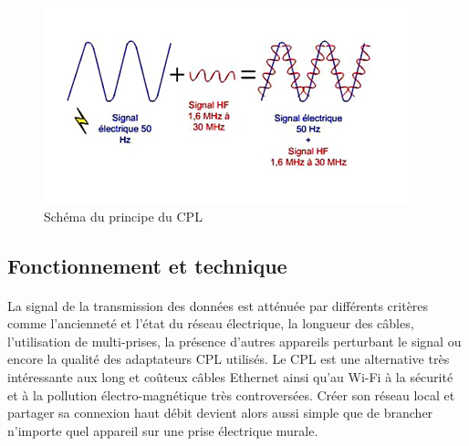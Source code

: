     \begin{figure}[h]
        \begin{center}
            \includegraphics[scale=0.7]{./images/cpl/principeCpl.jpg}
        \end{center}
            \caption{ Schéma du principe du CPL } %
            \label{Principe du CPL}
    \end{figure}

        \subsection{Fonctionnement et technique}
            \paragraph{}
La signal de la transmission des données est atténuée par différents critères comme l’ancienneté et l'état du réseau électrique,
la longueur des câbles, l'utilisation de multi-prises, la présence d'autres appareils perturbant le signal ou encore la qualité des adaptateurs CPL utilisés.
Le CPL est une alternative très intéressante aux long et coûteux câbles Ethernet ainsi qu'au Wi-Fi à la sécurité et à la pollution électro-magnétique très controversées.
Créer son réseau local et partager sa connexion haut débit devient alors aussi simple que de brancher n'importe quel appareil sur une prise électrique murale.

